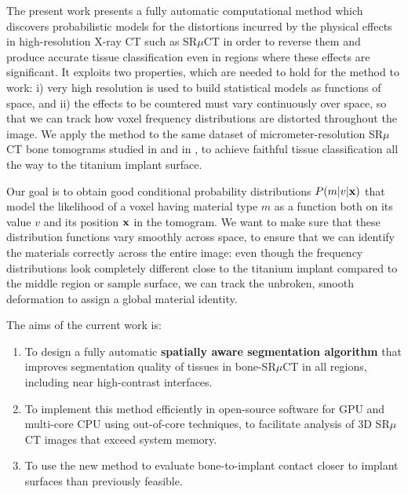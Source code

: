 The present work presents a fully automatic computational method which discovers probabilistic
models for the distortions incurred by the physical effects in high-resolution X-ray CT such
as SR$\mu$CT in order to reverse them and produce accurate tissue classification even in regions
where these effects are significant. It exploits two properties, which are needed to hold for
the method to work: i) very high resolution is used to build statistical models as functions
of space, and ii) the effects to be countered must vary continuously over space, so that we can
track how voxel frequency distributions are distorted throughout the image.
We apply the method to the
same dataset of micrometer-resolution SR$\mu$CT bone tomograms studied in \cite{torsten2018}
and in \cite{sporring}, to achieve faithful tissue classification all the way to the titanium
implant surface.

Our goal is to obtain good conditional probability distributions $P\!\left(m\vert v\middle\vert \mathbf{x}\right)$
that model the likelihood of a voxel having material type $m$ as a function
both on its value $v$ and its position $\mathbf{x}$ in the tomogram. We want to make sure that these distribution
functions vary smoothly across space, to ensure that we can identify the materials correctly across the entire
image: even though the frequency distributions look completely different
close to the titanium implant compared to the middle region or sample surface,
we can track the unbroken, smooth deformation to assign a global material
identity.

The aims of the current work is:
\begin{enumerate}
\item To design a fully automatic \textbf{spatially aware segmentation algorithm} that
  improves segmentation quality of tissues in bone-SR$\mu$CT in all regions, including near high-contrast interfaces.
\item To implement this method efficiently in open-source software for GPU and multi-core CPU using out-of-core techniques, to
  facilitate analysis of 3D SR$\mu$CT images that exceed system memory.
\item To use the new method to evaluate bone-to-implant contact closer to implant surfaces than previously feasible. 
\end{enumerate}




